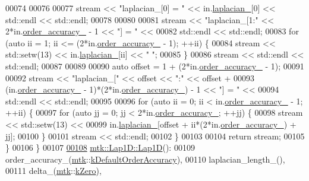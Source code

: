 \begin{DoxyCode}
00074 
00076 
00077   stream << \textcolor{stringliteral}{"laplacian\_[0] = "} << in.\hyperlink{classmtk_1_1Lap1D_a64a3977527c00b4ef994d1bd549f82fd}{laplacian\_}[0] << std::endl << std::endl;
00078 
00080 
00081   stream << \textcolor{stringliteral}{"laplacian\_[1:"} << 2*in.\hyperlink{classmtk_1_1Lap1D_a35d34c085b9cf6f9961a699dfb02fea6}{order\_accuracy\_} - 1 << \textcolor{stringliteral}{"] = "} <<
00082     std::endl << std::endl;
00083   \textcolor{keywordflow}{for} (\textcolor{keyword}{auto} ii = 1; ii <= (2*in.\hyperlink{classmtk_1_1Lap1D_a35d34c085b9cf6f9961a699dfb02fea6}{order\_accuracy\_} - 1); ++ii) \{
00084     stream << std::setw(13) << in.\hyperlink{classmtk_1_1Lap1D_a64a3977527c00b4ef994d1bd549f82fd}{laplacian\_}[ii] << \textcolor{stringliteral}{" "};
00085   \}
00086   stream << std::endl << std::endl;
00087 
00089 
00090   \textcolor{keyword}{auto} offset = 1 + (2*in.\hyperlink{classmtk_1_1Lap1D_a35d34c085b9cf6f9961a699dfb02fea6}{order\_accuracy\_} - 1);
00091 
00092   stream << \textcolor{stringliteral}{"laplacian\_["} << offset << \textcolor{stringliteral}{":"} << offset +
00093     (in.\hyperlink{classmtk_1_1Lap1D_a35d34c085b9cf6f9961a699dfb02fea6}{order\_accuracy\_} - 1)*(2*in.\hyperlink{classmtk_1_1Lap1D_a35d34c085b9cf6f9961a699dfb02fea6}{order\_accuracy\_}) - 1 << \textcolor{stringliteral}{"] = "} <<
00094     std::endl << std::endl;
00095 
00096   \textcolor{keywordflow}{for} (\textcolor{keyword}{auto} ii = 0; ii < in.\hyperlink{classmtk_1_1Lap1D_a35d34c085b9cf6f9961a699dfb02fea6}{order\_accuracy\_} - 1; ++ii) \{
00097     \textcolor{keywordflow}{for} (\textcolor{keyword}{auto} jj = 0; jj < 2*in.\hyperlink{classmtk_1_1Lap1D_a35d34c085b9cf6f9961a699dfb02fea6}{order\_accuracy\_}; ++jj) \{
00098       stream << std::setw(13) <<
00099         in.\hyperlink{classmtk_1_1Lap1D_a64a3977527c00b4ef994d1bd549f82fd}{laplacian\_}[offset + ii*(2*in.\hyperlink{classmtk_1_1Lap1D_a35d34c085b9cf6f9961a699dfb02fea6}{order\_accuracy\_}) + jj];
00100     \}
00101     stream << std::endl;
00102   \}
00103 
00104   \textcolor{keywordflow}{return} stream;
00105 \}
00106 \}
00107 
\hypertarget{mtk__lap__1d_8cc_source_l00108}{}\hyperlink{classmtk_1_1Lap1D_a6fc2aeea35d4dfa49f17e625411f5a70}{00108} \hyperlink{classmtk_1_1Lap1D_a6fc2aeea35d4dfa49f17e625411f5a70}{mtk::Lap1D::Lap1D}():
00109   order\_accuracy\_(\hyperlink{namespacemtk}{mtk}::\hyperlink{group__c01-roots_ga0d95560098eb36420511103637b6952f}{kDefaultOrderAccuracy}),
00110   laplacian\_length\_(),
00111   delta\_(\hyperlink{namespacemtk}{mtk}::\hyperlink{group__c01-roots_ga59a451a5fae30d59649bcda274fea271}{kZero}),

\end{DoxyCode}
